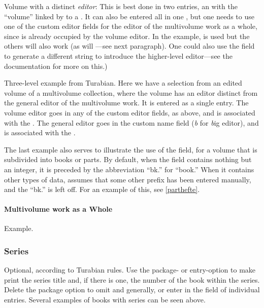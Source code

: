 \documentclass{ltxdockit}[2010/02/12]
\begin{document}
Volume with a distinct \emph{editor}: This is best done in two entries, an  with the  ``volume'' linked by  to a .\autocites[][]{1913botanischer-teil-x}  It can also be entered all in one , but one needs to use one of the custom editor fields for the editor of the multivolume work as a whole, since  is already occupied by the volume editor. In the example,   is used but the others will also work (as will ---see next paragraph).\autocites[][]{1913botanischer-teil-incoll}
One could also use the  field to generate a different string to introduce the higher-level editor---see the  documentation for more on this.)

Three-level example from Turabian.\autocites[][233]{mundy1998mesoamerican-ca} Here we have a selection from an edited volume of a multivolume collection, where the volume has an editor distinct from the general editor of the multivolume work. It is entered as a single  entry. The volume editor goes in any of the custom editor fields, as above, and is associated with the . The general editor goes in the custom name field  (\emph{b} for \emph{b}ig editor), and is associated with the .

The last example also serves to  illustrate the use of the  field, for a volume that is subdivided into books or parts. By default, when the field contains nothing but an integer, it is preceded by the abbreviation \enquote{bk.} for \enquote{book.} When it contains other types of data,  assumes that some other prefix has been entered manually, and the \enquote{bk.} is left off. For an example of this, see \ref{parthefte}.



\paragraph{Multivolume work as a Whole}
Example.\autocites[][]{1395, 2548}

\subsubsection{Series}
Optional, according to Turabian rules. Use the package- or entry-option  to make  print the series title and, if there is one, the number of the book within the series. Delete the package option to omit  and  generally, or enter  in the  field of individual entries. Several examples of books with series can be seen above.
\end{document}
